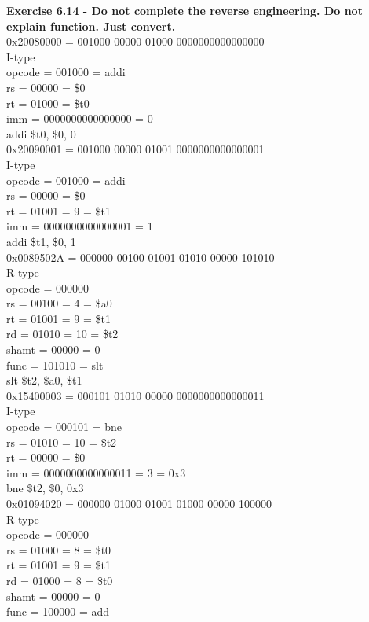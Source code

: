 \documentclass[12pt,a4paper]{report}
\begin{document}
\begin{normalsize}
\medskip

\textbf{Exercise 6.14 - Do not complete the reverse engineering. Do not explain function. Just convert.} \\

0x20080000 = 001000 00000 01000 0000000000000000 \\
I-type \\
opcode = 001000 = addi \\
rs = 00000 = \$0 \\
rt = 01000 = \$t0 \\
imm = 0000000000000000 = 0 \\

addi \$t0, \$0, 0 \\

0x20090001 = 001000 00000 01001 0000000000000001 \\
I-type \\
opcode = 001000 = addi \\
rs = 00000 = \$0 \\
rt = 01001 = 9 = \$t1 \\
imm = 0000000000000001 = 1\\

addi \$t1, \$0, 1 \\ 

0x0089502A = 000000 00100 01001 01010 00000 101010 \\
R-type \\
opcode = 000000 \\
rs = 00100 = 4 = \$a0 \\
rt = 01001 = 9 = \$t1 \\
rd = 01010 = 10 = \$t2 \\
shamt = 00000 = 0 \\
func = 101010 = slt \\

slt \$t2, \$a0, \$t1 \\

0x15400003 = 000101 01010 00000 0000000000000011 \\
I-type \\
opcode = 000101 = bne \\
rs = 01010 = 10 = \$t2 \\
rt = 00000 = \$0 \\
imm = 0000000000000011 = 3 = 0x3 \\

bne \$t2, \$0, 0x3 \\

0x01094020 = 000000 01000 01001 01000 00000 100000 \\
R-type \\
opcode = 000000 \\
rs = 01000 = 8 = \$t0 \\
rt = 01001 = 9 = \$t1 \\
rd = 01000 = 8 = \$t0 \\
shamt = 00000 = 0 \\
func = 100000 = add \\


\end{normalsize}
\end{document}
